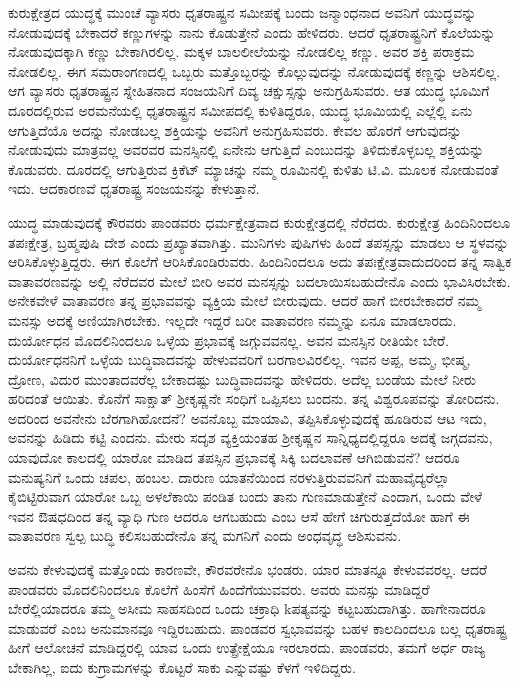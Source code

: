 ಕುರುಕ್ಷೇತ್ರದ ಯುದ್ಧಕ್ಕೆ ಮುಂಚೆ ವ್ಯಾಸರು ಧೃತರಾಷ್ಟ್ರನ ಸಮೀಪಕ್ಕೆ ಬಂದು ಜನ್ಮಾಂಧನಾದ ಅವನಿಗೆ ಯುದ್ಧವನ್ನು ನೋಡುವುದಕ್ಕೆ ಬೇಕಾದರೆ ಕಣ್ಣುಗಳನ್ನು ನಾನು ಕೊಡುತ್ತೇನೆ ಎಂದು ಹೇಳಿದರು. ಆದರೆ ಧೃತರಾಷ್ಟ್ರನಿಗೆ ಕೊಲೆಯನ್ನು ನೋಡುವುದಕ್ಕಾಗಿ ಕಣ್ಣು ಬೇಕಾಗಿರಲಿಲ್ಲ. ಮಕ್ಕಳ ಬಾಲಲೀಲೆಯನ್ನು ನೋಡಲಿಲ್ಲ ಕಣ್ಣು. ಅವರ ಶಕ್ತಿ ಪರಾಕ್ರಮ ನೋಡಲಿಲ್ಲ. ಈಗ ಸಮರಾಂಗಣದಲ್ಲಿ ಒಬ್ಬರು ಮತ್ತೊಬ್ಬರನ್ನು ಕೊಲ್ಲುವುದನ್ನು ನೋಡುವುದಕ್ಕೆ ಕಣ್ಣನ್ನು ಆಶಿಸಲಿಲ್ಲ. ಆಗ ವ್ಯಾಸರು ಧೃತರಾಷ್ಟ್ರನ ಸ್ನೇಹಿತನಾದ ಸಂಜಯನಿಗೆ ದಿವ್ಯ ಚಕ್ಷುಸ್ಸನ್ನು ಅನುಗ್ರಹಿಸುವರು. ಆತ ಯುದ್ಧ ಭೂಮಿಗೆ ದೂರದಲ್ಲಿರುವ ಅರಮನೆಯಲ್ಲಿ ಧೃತರಾಷ್ಟ್ರನ ಸಮೀಪದಲ್ಲಿ ಕುಳಿತಿದ್ದರೂ, ಯುದ್ಧ ಭೂಮಿಯಲ್ಲಿ ಎಲ್ಲೆಲ್ಲಿ ಏನು ಆಗುತ್ತಿದೆಯೊ ಅದನ್ನು ನೋಡಬಲ್ಲ ಶಕ್ತಿಯನ್ನು ಅವನಿಗೆ ಅನುಗ್ರಹಿಸುವರು. ಕೇವಲ ಹೊರಗೆ ಆಗುವುದನ್ನು ನೋಡುವುದು ಮಾತ್ರವಲ್ಲ ಅವರವರ ಮನಸ್ಸಿನಲ್ಲಿ ಏನೇನು ಆಗುತ್ತಿದೆ ಎಂಬುದನ್ನು ತಿಳಿದುಕೊಳ್ಳಬಲ್ಲ ಶಕ್ತಿಯನ್ನು ಕೊಡುವರು. ದೂರದಲ್ಲಿ ಆಗುತ್ತಿರುವ ಕ್ರಿಕೆಟ್ ಮ್ಯಾಚನ್ನು ನಮ್ಮ ರೂಮಿನಲ್ಲಿ ಕುಳಿತು ಟಿ.ವಿ. ಮೂಲಕ ನೋಡುವಂತೆ ಇದು. ಆದಕಾರಣವೆ ಧೃತರಾಷ್ಟ್ರ ಸಂಜಯನನ್ನು ಕೇಳುತ್ತಾನೆ.

ಯುದ್ಧ ಮಾಡುವುದಕ್ಕೆ ಕೌರವರು ಪಾಂಡವರು ಧರ್ಮಕ್ಷೇತ್ರವಾದ ಕುರುಕ್ಷೇತ್ರದಲ್ಲಿ ನೆರೆದರು. ಕುರುಕ್ಷೇತ್ರ ಹಿಂದಿನಿಂದಲೂ ತಪಃಕ್ಷೇತ್ರ, ಬ್ರಹ್ಮಪುಷಿ ದೇಶ ಎಂದು ಪ್ರಖ್ಯಾತವಾಗಿತ್ತು. ಮುನಿಗಳು ಪುಷಿಗಳು ಹಿಂದೆ ತಪಸ್ಸನ್ನು ಮಾಡಲು ಆ ಸ್ಥಳವನ್ನು ಆರಿಸಿಕೊಳ್ಳುತ್ತಿದ್ದರು. ಈಗ ಕೊಲೆಗೆ ಆರಿಸಿಕೊಂಡಿರುವರು. ಹಿಂದಿನಿಂದಲೂ ಅದು ತಪಃಕ್ಷೇತ್ರವಾದುದರಿಂದ ತನ್ನ ಸಾತ್ವಿಕ ವಾತಾವರಣವನ್ನು ಅಲ್ಲಿ ನೆರೆದವರ ಮೇಲೆ ಬೀರಿ ಅವರ ಮನಸ್ಸನ್ನು ಬದಲಾಯಿಸಬಹುದೇನೊ ಎಂದು ಭಾವಿಸಿರಬೇಕು. ಅನೇಕವೇಳೆ ವಾತಾವರಣ ತನ್ನ ಪ್ರಭಾವವನ್ನು ವ್ಯಕ್ತಿಯ ಮೇಲೆ ಬೀರುವುದು. ಆದರೆ ಹಾಗೆ ಬೀರಬೇಕಾದರೆ ನಮ್ಮ ಮನಸ್ಸು ಅದಕ್ಕೆ ಅಣಿಯಾಗಿರಬೇಕು. ಇಲ್ಲದೇ ಇದ್ದರೆ ಬರೀ ವಾತಾವರಣ ನಮ್ಮನ್ನು ಏನೂ ಮಾಡಲಾರದು. ದುರ್ಯೋಧನ ಮೊದಲಿನಿಂದಲೂ ಒಳ್ಳೆಯ ಪ್ರಭಾವಕ್ಕೆ ಜಗ್ಗುವವನಲ್ಲ. ಅವನ ಮನಸ್ಸಿನ ರೀತಿಯೇ ಬೇರೆ. ದುರ್ಯೋಧನನಿಗೆ ಒಳ್ಳೆಯ ಬುದ್ಧಿವಾದವನ್ನು ಹೇಳುವವರಿಗೆ ಬರಗಾಲವಿರಲಿಲ್ಲ. ಇವನ ಅಪ್ಪ, ಅಮ್ಮ, ಭೀಷ್ಮ, ದ್ರೋಣ, ವಿದುರ ಮುಂತಾದವರೆಲ್ಲ ಬೇಕಾದಷ್ಟು ಬುದ್ಧಿವಾದವನ್ನು ಹೇಳಿದರು. ಅದೆಲ್ಲ ಬಂಡೆಯ ಮೇಲೆ ನೀರು ಹರಿದಂತೆ ಆಯಿತು. ಕೊನೆಗೆ ಸಾಕ್ಷಾತ್ ಶ‍್ರೀಕೃಷ್ಣನೇ ಸಂಧಿಗೆ ಒಪ್ಪಿಸಲು ಬಂದನು. ತನ್ನ ವಿಶ್ವರೂಪವನ್ನು ತೋರಿದನು. ಅದರಿಂದ ಅವನೇನು ಬೆರಗಾಗಿಹೋದನೆ? ಅವನೊಬ್ಬ ಮಾಯಾವಿ, ತಪ್ಪಿಸಿಕೊಳ್ಳುವುದಕ್ಕೆ ಹೂಡಿರುವ ಆಟ ಇದು, ಅವನನ್ನು ಹಿಡಿದು ಕಟ್ಟಿ ಎಂದನು. ಮೇರು ಸದೃಶ ವ್ಯಕ್ತಿಯಂತಹ ಶ‍್ರೀಕೃಷ್ಣನ ಸಾನ್ನಿಧ್ಯದಲ್ಲಿದ್ದರೂ ಅದಕ್ಕೆ ಜಗ್ಗದವನು, ಯಾವುದೋ ಕಾಲದಲ್ಲಿ ಯಾರೋ ಮಾಡಿದ ತಪಸ್ಸಿನ ಪ್ರಭಾವಕ್ಕೆ ಸಿಕ್ಕಿ ಬದಲಾವಣೆ ಆಗಿಬಿಡುವನೆ? ಆದರೂ ಮನುಷ್ಯನಿಗೆ ಒಂದು ಚಪಲ, ಹಂಬಲ. ದಾರುಣ ಯಾತನೆಯಿಂದ ನರಳುತ್ತಿರುವವನಿಗೆ ಮಹಾವೈದ್ಯರೆಲ್ಲಾ ಕೈಬಿಟ್ಟಿರುವಾಗ ಯಾರೋ ಒಬ್ಬ ಅಳಲೆಕಾಯಿ ಪಂಡಿತ ಬಂದು ತಾನು ಗುಣಮಾಡುತ್ತೇನೆ ಎಂದಾಗ, ಒಂದು ವೇಳೆ ಇವನ ಔಷಧದಿಂದ ತನ್ನ ವ್ಯಾಧಿ ಗುಣ ಆದರೂ ಆಗಬಹುದು ಎಂಬ ಆಸೆ ಹೇಗೆ ಚಿಗುರುತ್ತದೆಯೋ ಹಾಗೆ ಈ ವಾತಾವರಣ ಸ್ವಲ್ಪ ಬುದ್ಧಿ ಕಲಿಸಬಹುದೇನೊ ತನ್ನ ಮಗನಿಗೆ ಎಂದು ಅಂಧವೃದ್ಧ ಆಶಿಸುವನು.

ಅವನು ಕೇಳುವುದಕ್ಕೆ ಮತ್ತೊಂದು ಕಾರಣವೇ, ಕೌರವರೇನೊ ಭಂಡರು. ಯಾರ ಮಾತನ್ನೂ ಕೇಳುವವರಲ್ಲ. ಆದರೆ ಪಾಂಡವರು ಮೊದಲಿನಿಂದಲೂ ಕೊಲೆಗೆ ಹಿಂಸೆಗೆ ಹಿಂದೆಗೆಯುವವರು. ಅವರು ಮನಸ್ಸು ಮಾಡಿದ್ದರೆ ಬೇರೆಲ್ಲಿಯಾದರೂ ತಮ್ಮ ಅಸೀಮ ಸಾಹಸದಿಂದ ಒಂದು ಚಕ್ರಾಧಿ kಪತ್ಯವನ್ನು ಕಟ್ಟಬಹುದಾಗಿತ್ತು. ಹಾಗೇನಾದರೂ ಮಾಡುವರೆ ಎಂಬ ಅನುಮಾನವೂ ಇದ್ದಿರಬಹುದು. ಪಾಂಡವರ ಸ್ವಭಾವವನ್ನು ಬಹಳ ಕಾಲದಿಂದಲೂ ಬಲ್ಲ ಧೃತರಾಷ್ಟ್ರ ಹೀಗೆ ಆಲೋಚನೆ ಮಾಡಿದ್ದರಲ್ಲಿ ಯಾವ ಒಂದು ಉತ್ಪ್ರೇಕ್ಷೆಯೂ ಇರಲಾರದು. ಪಾಂಡವರು, ತಮಗೆ ಅರ್ಧ ರಾಜ್ಯ ಬೇಕಾಗಿಲ್ಲ, ಐದು ಕುಗ್ರಾಮಗಳನ್ನು ಕೊಟ್ಟರೆ ಸಾಕು ಎನ್ನುವಷ್ಟು ಕೆಳಗೆ ಇಳಿದಿದ್ದರು.

